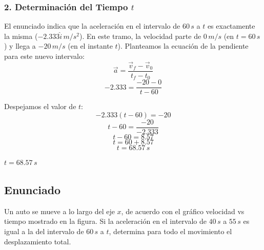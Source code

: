 \documentclass[12pt, a4paper]{article}
\begin{document}
\subsubsection*{2. Determinación del Tiempo $t$}
El enunciado indica que la aceleración en el intervalo de $60 \, \si{s}$ a $t$ es exactamente la misma ($-2.333\hat{i} \, \si{m/s^2}$). En este tramo, la velocidad parte de $0 \, \si{m/s}$ (en $t = 60 \, \si{s}$) y llega a $-20 \, \si{m/s}$ (en el instante $t$).
Planteamos la ecuación de la pendiente para este nuevo intervalo:
$$ \vec{a} = \frac{\vec{v}_f - \vec{v}_0}{t_f - t_0} $$
$$ -2.333 = \frac{-20 - 0}{t - 60} $$

Despejamos el valor de $t$:
$$ -2.333 (t - 60) = -20 $$
$$ t - 60 = \frac{-20}{-2.333} $$
$$ t - 60 = 8.57 $$
$$ t = 60 + 8.57 $$
$$ t = 68.57 \, \si{s} $$

\begin{tcolorbox}[colback=green!5!white, colframe=green!50!black, title=Respuesta Final]
\centering \Large $t = 68.57 \, \si{s}$
\end{tcolorbox}

\newpage

\subsection*{Enunciado}
Un auto se mueve a lo largo del eje $x$, de acuerdo con el gráfico velocidad vs tiempo mostrado en la figura. Si la aceleración en el intervalo de $40 \, \si{s}$ a $55 \, \si{s}$ es igual a la del intervalo de $60 \, \si{s}$ a $t$, determina para todo el movimiento el desplazamiento total.
\end{document}
